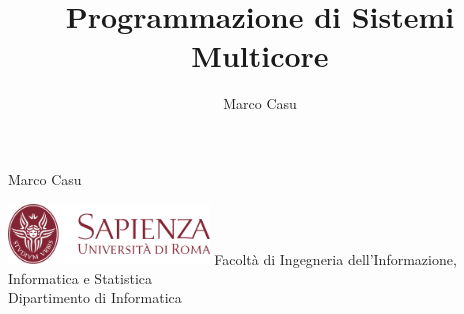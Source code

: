\documentclass[10pt, letterpaper]{report}
\title{Programmazione di Sistemi Multicore} %
\author{Marco Casu}
\date{\vspace{-5ex}}
\begin{document}
\begin{titlepage}
    \pagecolor{purcop}
\begin{center}
   \Huge Marco Casu\acc
    \HUGE \decothreeleft\hphantom{ }{\Huge\selectfont Programmazione di Sistemi Multicore}\hphantom{ }\decothreeright
\end{center}
\thispagestyle{empty}
\begin{figure}[h]
\end{figure}
\vfill 
\centering \includegraphics[width=0.4\textwidth ]{../../../preamble/Stemma_sapienza.png} \acc
\centering \Large \color{sapienza}Facoltà di Ingegneria dell'Informazione,
Informatica e Statistica\\
Dipartimento di Informatica
\end{titlepage}
\end{document}
